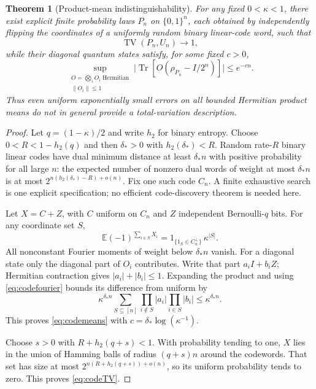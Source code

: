 \documentclass[11pt,reqno]{amsart}
\numberwithin{equation}{section}
\newtheorem{theorem}{Theorem}[section]
\theoremstyle{definition}
\theoremstyle{remark}
\newcommand{\Tr}{\operatorname{Tr}}
\newcommand{\TV}{\operatorname{TV}}
\newcommand{\E}{\mathbb E}
\newcommand{\nn}[1]{\lVert#1\rVert}
\newcommand{\abs}[1]{\lvert#1\rvert}
\begin{document}
\begin{theorem}[Product-mean indistinguishability]\label{thm:code}
For any fixed $0<\kappa<1$, there exist explicit finite probability laws $P_n$ on $\{0,1\}^n$, each obtained by independently flipping the coordinates of a uniformly random binary linear-code word, such that
\begin{equation}\label{eq:codeTV}
 \TV(P_n,U_n)\longrightarrow1,
\end{equation}
while their diagonal quantum states satisfy, for some fixed $c>0$,
\begin{equation}\label{eq:codemeans}
 \sup_{\substack{O=\bigotimes_iO_i\;\text{Hermitian}\\\nn{O_i}\leq1}}
 \abs{\Tr[O(\rho_{P_n}-I/2^n)]}\leq e^{-cn}.
\end{equation}
Thus even uniform exponentially small errors on all bounded Hermitian product means do not in general provide a total-variation description.
\end{theorem}
\begin{proof}
Let $q=(1-\kappa)/2$ and write $h_2$ for binary entropy. Choose $0<R<1-h_2(q)$ and then $\delta_*>0$ with $h_2(\delta_*)<R$. Random rate-$R$ binary linear codes have dual minimum distance at least $\delta_*n$ with positive probability for all large $n$: the expected number of nonzero dual words of weight at most $\delta_*n$ is at most $2^{n(h_2(\delta_*)-R)+o(n)}$. Fix one such code $C_n$. A finite exhaustive search is one explicit specification; no efficient code-discovery theorem is needed here.

Let $X=C+Z$, with $C$ uniform on $C_n$ and $Z$ independent Bernoulli-$q$ bits. For any coordinate set $S$,
\begin{equation}\label{eq:codefourier}
 \E(-1)^{\sum_{i\in S}X_i}
 =1_{\{1_S\in C_n^\perp\}}\,\kappa^{|S|}.
\end{equation}
All nonconstant Fourier moments of weight below $\delta_*n$ vanish. For a diagonal state only the diagonal part of $O_i$ contributes. Write that part $a_iI+b_iZ$; Hermitian contraction gives $|a_i|+|b_i|\leq1$. Expanding the product and using \eqref{eq:codefourier} bounds its difference from uniform by
\[
 \kappa^{\delta_*n}\sum_{S\subseteq[n]}
       \prod_{i\notin S}|a_i|\prod_{i\in S}|b_i|
 \leq\kappa^{\delta_*n}.
\]
This proves \eqref{eq:codemeans} with $c=\delta_*\log(\kappa^{-1})$.

Choose $s>0$ with $R+h_2(q+s)<1$. With probability tending to one, $X$ lies in the union of Hamming balls of radius $(q+s)n$ around the codewords. That set has size at most $2^{n(R+h_2(q+s))+o(n)}$, so its uniform probability tends to zero. This proves \eqref{eq:codeTV}.
\end{proof}
\end{document}
